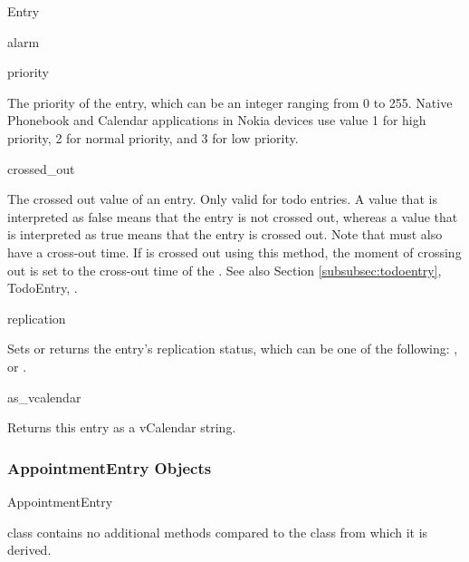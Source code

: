 \begin{classdesc*}{Entry}
\begin{memberdesc}[Entry]{alarm}
\end{memberdesc}

\begin{memberdesc}[Entry]{priority}

The priority of the entry, which can be an integer ranging from 0 to 255. Native 
Phonebook and Calendar applications in Nokia devices use value 1 for high 
priority, 2 for normal priority, and 3 for low priority. 

\end{memberdesc}

\begin{memberdesc}[Entry]{crossed_out}

The crossed out value of an entry. Only valid for todo entries.
A value that is interpreted as false means 
that the entry is not crossed out, whereas a value that is interpreted as true 
means that the entry is crossed out. Note that  must also 
have a cross-out time. If  is crossed out using this method, 
the moment of crossing out is set to the cross-out time of the . 
See also Section \ref{subsubsec:todoentry}, TodoEntry, .

\end{memberdesc}

\begin{memberdesc}[Entry]{replication}

Sets or returns the entry's replication status, which can be one of the 
following: ,  or .

\end{memberdesc}

\begin{methoddesc}[Entry]{as_vcalendar}{}

Returns this entry as a vCalendar string.

\end{methoddesc}

\end{classdesc*}

\subsubsection{AppointmentEntry Objects}
\label{subsubsec:appointmententry}

\begin{classdesc*}{AppointmentEntry}
\end{classdesc*}

 class contains no additional methods compared to 
the  class from which it is derived.

